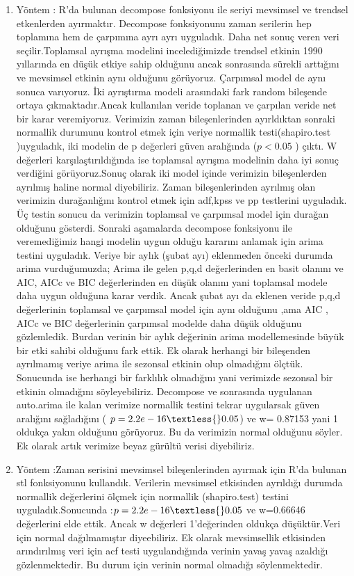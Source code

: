 \documentclass[11pt]{article}
\begin{document}
\begin{enumerate}
\def\labelenumi{\arabic{enumi}.}
\item
  Yöntem : R'da bulunan decompose fonksiyonu ile seriyi mevsimsel ve
  trendsel etkenlerden ayırmaktır. Decompose fonksiyonunu zaman
  serilerin hep toplamına hem de çarpımına ayrı ayrı uyguladık. Daha net
  sonuç veren veri seçilir.Toplamsal ayrışma modelini incelediğimizde
  trendsel etkinin 1990 yıllarında en düşük etkiye sahip olduğunu ancak
  sonrasında sürekli arttığını ve mevsimsel etkinin aynı olduğunu
  görüyoruz. Çarpımsal model de aynı sonuca varıyoruz. İki ayrıştırma
  modeli arasındaki fark random bileşende ortaya çıkmaktadır.Ancak
  kullanılan veride toplanan ve çarpılan veride net bir karar
  veremiyoruz. Verimizin zaman bileşenlerinden ayırldıktan sonraki
  normallik durumunu kontrol etmek için veriye normallik
  testi(shapiro.test )uyguladık, iki modelin de p değerleri güven
  aralığında (\(p<0.05\) ) çıktı. W değerleri karşılaştırıldığında ise
  toplamsal ayrışma modelinin daha iyi sonuç verdiğini görüyoruz.Sonuç
  olarak iki model içinde verimizin bileşenlerden ayrılmış haline normal
  diyebiliriz. Zaman bileşenlerinden ayrılmış olan verimizin
  durağanlığını kontrol etmek için adf,kpss ve pp testlerini uyguladık.
  Üç testin sonucu da verimizin toplamsal ve çarpımsal model için
  durağan olduğunu gösterdi. Sonraki aşamalarda decompose fonksiyonu ile
  veremediğimiz hangi modelin uygun olduğu kararını anlamak için arima
  testini uyguladık. Veriye bir aylık (şubat ayı) eklenmeden önceki
  durumda arima vurduğumuzda; Arima ile gelen p,q,d değerlerinden en
  basit olanını ve AIC, AICc ve BIC değerlerinden en düşük olanını yani
  toplamsal modele daha uygun olduğuna karar verdik. Ancak şubat ayı da
  eklenen veride p,q,d değerlerinin toplamsal ve çarpımsal model için
  aynı olduğunu ,ama AIC , AICc ve BIC değerlerinin çarpımsal modelde
  daha düşük olduğunu gözlemledik. Burdan verinin bir aylık değerinin
  arima modellemesinde büyük bir etki sahibi olduğunu fark ettik. Ek
  olarak herhangi bir bileşenden ayrılmamış veriye arima ile sezonsal
  etkinin olup olmadığını ölçtük. Sonucunda ise herhangi bir farklılık
  olmadığını yani verimizde sezonsal bir etkinin olmadığını
  söyleyebiliriz. Decompose ve sonrasında uygulanan auto.arima ile kalan
  verimize normallik testini tekrar uygularsak güven aralığını
  sağladığını ( \( p=2.2e-16 \textless{}0.05 \)) ve w= 0.87153 yani 1
  oldukça yakın olduğunu görüyoruz. Bu da verimizin normal olduğunu
  söyler. Ek olarak artık verimize beyaz gürültü verisi diyebiliriz.
\item
  Yöntem :Zaman serisini mevsimsel bileşenlerinden ayırmak için R'da
  bulunan stl fonksiyonunu kullandık. Verilerin mevsimsel etkisinden
  ayrıldığı durumda normallik değerlerini ölçmek için normallik
  (shapiro.test) testini uyguladık.Sonucunda :\(p=2.2e-16 \textless{}0.05 \) ve w=0.66646 değerlerini elde ettik. Ancak w
  değerleri 1'değerinden oldukça düşüktür.Veri için normal dağılmamıştır
  diyeebiliriz. Ek olarak mevsimsellik etkisinden arındırılmış veri için
  acf testi uygulandığında verinin yavaş yavaş azaldığı gözlenmektedir.
  Bu durum için verinin normal olmadığı söylenmektedir.
\end{enumerate}
\end{document}
